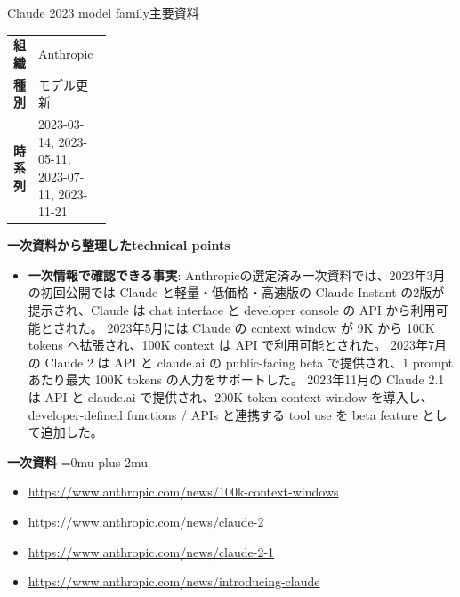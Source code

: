 \begin{technicalnote}{Claude 2023 model family}{主要資料}
\begingroup
\begin{tabularx}{\linewidth}{@{}>{\bfseries}p{0.22\linewidth}X@{}}
組織 & Anthropic \\
種別 & モデル更新 \\
時系列 & 2023-03-14, 2023-05-11, 2023-07-11, 2023-11-21 \\
\end{tabularx}
\smallskip
{\bfseries 一次資料から整理したtechnical points}
\begin{itemize}[leftmargin=1.5em,itemsep=0.35em]
\item \textbf{一次情報で確認できる事実}: Anthropicの選定済み一次資料では、2023年3月の初回公開では Claude と軽量・低価格・高速版の Claude Instant の2版が提示され、Claude は chat interface と developer console の API から利用可能とされた。 2023年5月には Claude の context window が 9K から 100K tokens へ拡張され、100K context は API で利用可能とされた。 2023年7月の Claude 2 は API と claude.ai の public-facing beta で提供され、1 prompt あたり最大 100K tokens の入力をサポートした。 2023年11月の Claude 2.1 は API と claude.ai で提供され、200K-token context window を導入し、developer-defined functions / APIs と連携する tool use を beta feature として追加した。
\end{itemize}
\begin{minipage}{\linewidth}
\begin{samepage}
{\bfseries 一次資料}
\begingroup\sloppy
\Urlmuskip=0mu plus 2mu\relax
\begin{itemize}[leftmargin=1.5em,itemsep=0.25em]
\item {\scriptsize\url{https://www.anthropic.com/news/100k-context-windows}}
\item {\scriptsize\url{https://www.anthropic.com/news/claude-2}}
\item {\scriptsize\url{https://www.anthropic.com/news/claude-2-1}}
\item {\scriptsize\url{https://www.anthropic.com/news/introducing-claude}}
\end{itemize}
\endgroup
\end{samepage}
\end{minipage}
\endgroup
\end{technicalnote}
\medskip

